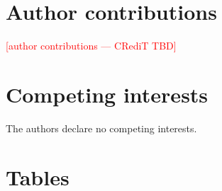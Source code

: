 \documentclass[12pt, a4paper]{article}
\newcommand{\PH}[1]{\textcolor{red}{#1}}
\begin{document}
\section*{Author contributions}
\PH{[author contributions --- CRediT TBD]}

\section*{Competing interests}

The authors declare no competing interests.






\newpage
\section*{Tables}
\end{document}
